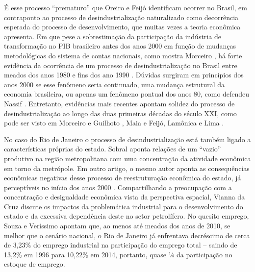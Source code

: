 É esse processo ``prematuro'' que Oreiro e Feijó
\citet{oreiro_desindustrializacao_2010} identificam
ocorrer no Brasil, em contraponto ao processo de desindustrialização
naturalizado como decorrência esperada do processo de desenvolvimento,
que muitas vezes a teoria econômica apresenta. Em que pese a
sobrestimação da participação da indústria de transformação no PIB
brasileiro antes dos anos 2000 em função de mudanças metodológicas do
sistema de contas nacionais, como mostra Morceiro
\citet{morceiro2021}, há forte
evidência da ocorrência de um processo de desindustrialização no Brasil
entre meados dos anos 1980 e fins dos ano 1990
\citep{oreiromarconi2012}. Dúvidas surgiram em princípios dos anos 2000 se esse fenômeno
seria continuado, uma mudança estrutural da economia brasileira, ou
apenas um fenômeno pontual dos anos 80, como defendeu Nassif
\citep{nassif_ha_2008} .
Entretanto, evidências mais recentes apontam solidez do processo de
desindustrialização ao longo das duas primeiras décadas do século XXI,
como pode ser visto em Morceiro e Guilhoto
\citet{morceiro_adensamento_2020}, Maia
\citet{maia_ha_2020} e Feijó,
Lamônica e Lima
\citet{feijo_financial_2019}.

No caso do Rio de Janeiro o processo de desindustrialização está também
ligado a características próprias do estado. Sobral
\citet{sobral2016} aponta
relações de um ``vazio'' produtivo na região metropolitana com uma
concentração da atividade econômica em torno da metrópole. Em outro
artigo, o mesmo autor aponta as consequências econômicas negativas desse
processo de reestruturação econômica do estado, já perceptíveis no
início dos anos 2000
\citep{sobral2017}.
Compartilhando a preocupação com a concentração e desigualdade econômica
vista da perspectiva espacial, Vianna da Cruz
\citet{vianna_da_cruz_os_2013} discute os
impactos da problemática industrial para o desenvolvimento do estado e
da excessiva dependência deste no setor petrolífero. No quesito emprego,
Souza e Veríssimo
\citet{souza_producao_2019} apontam que,
ao menos até meados dos anos de 2010, se melhor que o cenário nacional,
o Rio de Janeiro já enfrentava decréscimo de cerca de 3,23\% do emprego
industrial na participação do emprego total -- saindo de 13,2\% em 1996
para 10,22\% em 2014, portanto, quase ¼ da participação no estoque de
emprego.

